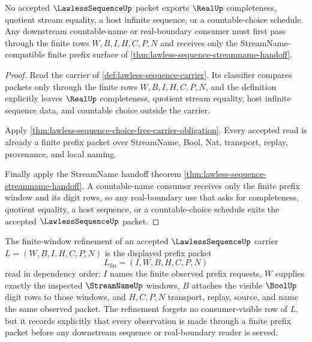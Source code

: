 \begin{theorem}
\label{thm:lawless-sequence-real-boundary-nonescape}
No accepted $\LawlessSequenceUp$ packet exports $\RealUp$ completeness, quotient stream equality, a host infinite sequence, or a countable-choice schedule. Any downstream countable-name or real-boundary consumer must first pass through the finite rows $W,B,I,H,C,P,N$ and receives only the StreamName-compatible finite prefix surface of \autoref{thm:lawless-sequence-streamname-handoff}.
\end{theorem}
\begin{proof}
Read the carrier of \autoref{def:lawless-sequence-carrier}. Its classifier compares packets only through the finite rows $W,B,I,H,C,P,N$, and the definition explicitly leaves $\RealUp$ completeness, quotient stream equality, host infinite sequence data, and countable choice outside the carrier.

Apply \autoref{thm:lawless-sequence-choice-free-carrier-obligation}. Every accepted read is already a finite prefix packet over StreamName, Bool, Nat, transport, replay, provenance, and local naming.

Finally apply the StreamName handoff theorem \autoref{thm:lawless-sequence-streamname-handoff}. A countable-name consumer receives only the finite prefix window and its digit rows, so any real-boundary use that asks for completeness, quotient equality, a host sequence, or a countable-choice schedule exits the accepted $\LawlessSequenceUp$ packet.
\end{proof}

\begin{definition}
\label{def:lawless-sequence-finite-window-carrier}
The finite-window refinement of an accepted $\LawlessSequenceUp$ carrier $L=(W,B,I,H,C,P,N)$ is the displayed prefix packet
$$
L_{\mathrm{fin}}=(I,W,B,H,C,P,N)
$$
read in dependency order: $I$ names the finite observed prefix requests, $W$ supplies exactly the inspected $\StreamNameUp$ windows, $B$ attaches the visible $\BoolUp$ digit rows to those windows, and $H,C,P,N$ transport, replay, source, and name the same observed packet. The refinement forgets no consumer-visible row of $L$, but it records explicitly that every observation is made through a finite prefix packet before any downstream sequence or real-boundary reader is served.
\end{definition}

